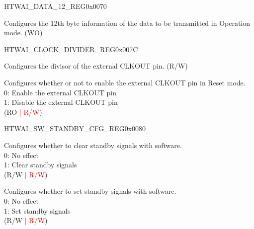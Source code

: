 \begin{register}{H}{TWAI\_DATA\_12\_REG}{0x0070}\label{regdesc:TWAIDATA12REG}
%
%
\regnewline%
\begin{regdesc}\begin{reglist}
\label{fielddesc:TWAITXBYTE12}\item [TWAI\_TX\_BYTE\_12] Configures the 12th byte information of the data to be transmitted in Operation mode. (WO)
\end{reglist}\end{regdesc}
\end{register}


\begin{register}{H}{TWAI\_CLOCK\_DIVIDER\_REG}{0x007C}\label{regdesc:TWAICLOCKDIVIDERREG}
%
%
%
\regnewline%
\begin{regdesc}\begin{reglist}
\label{fielddesc:TWAICD}\item [TWAI\_CD] Configures the divisor of the external CLKOUT pin. (R/W)
\label{fielddesc:TWAICLOCKOFF}\item [TWAI\_CLOCK\_OFF] Configures whether or not to enable the external CLKOUT pin in Reset mode. \\
0: Enable the external CLKOUT pin\\
1: Disable the external CLKOUT pin \\
(RO \textcolor{red}{| R/W})
\end{reglist}\end{regdesc}
\end{register}


\begin{register}{H}{TWAI\_SW\_STANDBY\_CFG\_REG}{0x0080}\label{regdesc:TWAISWSTANDBYCFGREG}
%
%
%
\regnewline%
\begin{regdesc}\begin{reglist}
\label{fielddesc:TWAISWSTANDBYCLR}\item [TWAI\_SW\_STANDBY\_CLR] Configures whether to clear standby signals with software. \\
0: No effect\\
1: Clear standby signals \\
(R/W \textcolor{red}{| R/W})
\label{fielddesc:TWAISWSTANDBYEN}\item [TWAI\_SW\_STANDBY\_EN] Configures whether to set standby signals with software.\\
0: No effect\\
1: Set standby signals \\
(R/W \textcolor{red}{| R/W})
\end{reglist}\end{regdesc}
\end{register}


